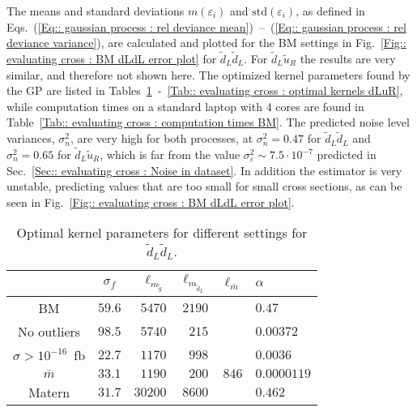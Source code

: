 \documentclass[twoside,english]{uiofysmaster}
\begin{document}
{The means and standard deviations $m(\varepsilon_i)$ and $\text{std}(\varepsilon_i)$, as defined in Eqs.~(\ref{Eq:: gaussian process : rel deviance mean})~--~(\ref{Eq:: gaussian process : rel deviance variance}), are calculated  and plotted for the BM settings in Fig.~\ref{Fig:: evaluating cross : BM dLdL error plot} for $\widetilde{d}_L \widetilde{d}_L$. For $\widetilde{d}_L \widetilde{u}_R$  the results are very similar, and therefore not shown here. The optimized kernel parameters found by the GP are listed in Tables~\ref{Tab:: evaluating cross : optimal kernels dLdL}~-~\ref{Tab:: evaluating cross : optimal kernels dLuR}, while computation times on a standard laptop with 4 cores are found in Table~\ref{Tab:: evaluating cross : computation times BM}. The predicted noise level variances, $\sigma_n^2$, are very high for both processes, at $\sigma_n^2=0.47$ for $\widetilde{d}_L \widetilde{d}_L$ and $\sigma_n^2=0.65$ for $\widetilde{d}_L \widetilde{u}_R$, which is far from the value $\sigma_{\varepsilon}^2 \sim 7.5 \cdot 10^{-7}$ predicted in Sec.~\ref{Sec:: evaluating cross : Noise in dataset}. In addition the estimator is very unstable, predicting values that are too small for small cross sections, as can be seen in Fig.~\ref{Fig:: evaluating cross : BM dLdL error plot}.

\begin{table}
\centering
\begin{tabular}{@{}ccrrrl@{}} \toprule
 & $\sigma_f$ & $\ell_{m_{\widetilde{g}}}$ & $\ell_{m_{\widetilde{d}_L}}$ & $\ell_{\bar{m}}$ & $\alpha$\\ \midrule
BM & $59.6$ & $5470 $& $ 2190$ & & $0.47$\\
No outliers & $98.5$ & $5740$ & $215$ & & $0.00372$\\
$\sigma > 10^{-16}$~fb & $22.7$ & $1170$&  $998$ && $0.0036$\\
$\bar{m}$ & $33.1$ & $1190$ & $200$ & $846$ & $0.0000119$\\
Matern & $31.7$ & $30200$ & $8600$ && $0.462$\\ \bottomrule
\end{tabular}
\caption{Optimal kernel parameters for different settings for $\widetilde{d}_L \widetilde{d}_L$.}
\label{Tab:: evaluating cross : optimal kernels dLdL}
\end{table}

}
\end{document}
